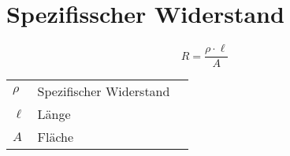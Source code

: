 



\section{Spezifisscher Widerstand}
\[ R = \frac{\rho \cdot \ell}{A} \]
\begin{tabular}{lll}
$\rho$&Spezifischer Widerstand&\\
$\ell$&Länge&\\
   $A$&Fläche&\\
\end{tabular}